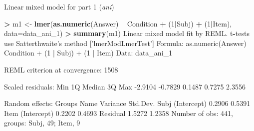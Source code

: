 \documentclass[ignorenonframetext,]{beamer}
\newenvironment{Shaded}{\begin{snugshade}}{\end{snugshade}}
\newcommand{\KeywordTok}[1]{\textcolor[rgb]{0.13,0.29,0.53}{\textbf{#1}}}
\newcommand{\DataTypeTok}[1]{\textcolor[rgb]{0.13,0.29,0.53}{#1}}
\newcommand{\DecValTok}[1]{\textcolor[rgb]{0.00,0.00,0.81}{#1}}
\newcommand{\StringTok}[1]{\textcolor[rgb]{0.31,0.60,0.02}{#1}}
\newcommand{\OperatorTok}[1]{\textcolor[rgb]{0.81,0.36,0.00}{\textbf{#1}}}
\newcommand{\NormalTok}[1]{#1}
\begin{document}
\begin{frame}{Linear mixed model for part 1
(\emph{ani})}

\tiny

\begin{Shaded}
\begin{Highlighting}[]
\OperatorTok{>}\StringTok{ }\NormalTok{m1 <-}\StringTok{ }\KeywordTok{lmer}\NormalTok{(}\KeywordTok{as.numeric}\NormalTok{(Answer) }\OperatorTok{~}\StringTok{ }\NormalTok{Condition }\OperatorTok{+}\StringTok{ }\NormalTok{(}\DecValTok{1}\OperatorTok{|}\NormalTok{Subj) }\OperatorTok{+}\StringTok{ }\NormalTok{(}\DecValTok{1}\OperatorTok{|}\NormalTok{Item), }\DataTypeTok{data=}\NormalTok{data_ani_}\DecValTok{1}\NormalTok{)}
\OperatorTok{>}\StringTok{ }\KeywordTok{summary}\NormalTok{(m1)}
\NormalTok{Linear mixed model fit by REML. t}\OperatorTok{-}\NormalTok{tests use Satterthwaite}\StringTok{'s method ['}\NormalTok{lmerModLmerTest}\StringTok{']}
\StringTok{Formula: as.numeric(Answer) ~ Condition + (1 | Subj) + (1 | Item)}
\StringTok{   Data: data_ani_1}

\StringTok{REML criterion at convergence: 1508}

\StringTok{Scaled residuals: }
\StringTok{    Min      1Q  Median      3Q     Max }
\StringTok{-2.9104 -0.7829  0.1487  0.7275  2.3556 }

\StringTok{Random effects:}
\StringTok{ Groups   Name        Variance Std.Dev.}
\StringTok{ Subj     (Intercept) 0.2906   0.5391  }
\StringTok{ Item     (Intercept) 0.2202   0.4693  }
\StringTok{ Residual             1.5272   1.2358  }
\StringTok{Number of obs: 441, groups:  Subj, 49; Item, 9}
\end{Highlighting}
\end{Shaded}

\end{frame}
\end{document}
